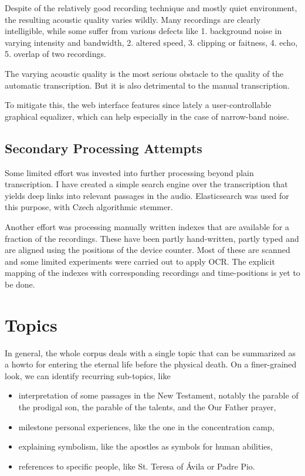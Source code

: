 \documentclass[a4paper,11pt]{article}
\begin{document}
Despite of the relatively good recording technique and mostly quiet environment,
the resulting acoustic quality varies wildly. Many recordings are clearly
intelligible, while some suffer from various defects like
1. background noise in varying intensity and bandwidth,
2. altered speed,
3. clipping or faitness,
4. echo,
5. overlap of two recordings.

The varying acoustic quality is the most serious obstacle to the quality of the
automatic transcription. But it is also detrimental to the manual transcription.

To mitigate this, the web interface features since lately a user-controllable
graphical equalizer, which can help especially in the case of narrow-band noise.

\subsection{Secondary Processing Attempts}

Some limited effort was invested into further processing beyond plain
transcription. I have created a simple search engine over the transcription that
yields deep links into relevant passages in the audio. Elasticsearch was used
for this purpose, with Czech algorithmic stemmer.

Another effort was processing manually written indexes that are available for a
fraction of the recordings. These have been partly hand-written, partly typed
and are aligned using the positions of the device counter. Most of these are
scanned and some limited experiments were carried out to apply OCR. The explicit
mapping of the indexes with corresponding recordings and time-positions is yet
to be done.

\section{Topics}

In general, the whole corpus deals with a single topic that can be summarized as
a howto for entering the eternal life before the physical death. On a
finer-grained look, we can identify recurring sub-topics, like

\begin{itemize}
\item{interpretation of some passages in the New Testament, notably the parable
of the prodigal son, the parable of the talents, and the Our Father prayer,}
\item{milestone personal experiences, like the one in the concentration camp,}
\item{explaining symbolism, like the apostles as symbols for human abilities,}
\item{references to specific people, like St. Teresa of \'{A}vila or Padre Pio.}
\end{itemize}
\end{document}
